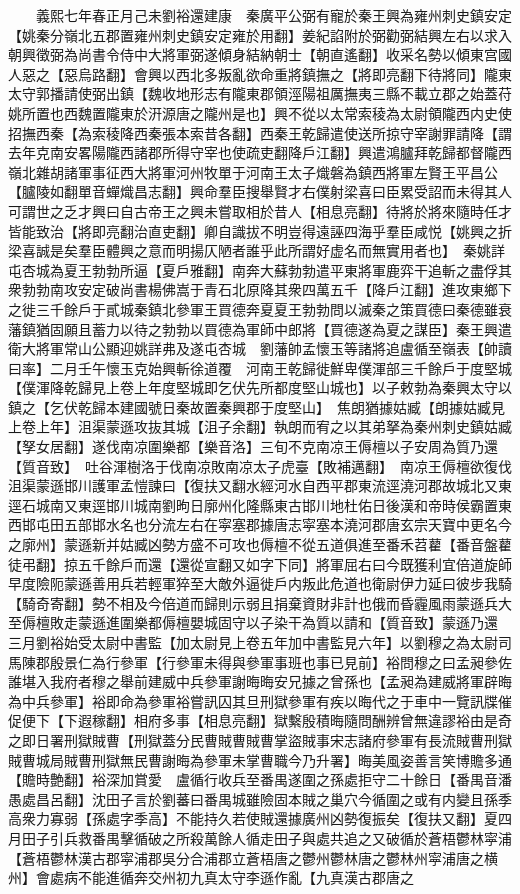　　義熙七年春正月己未劉裕還建康　秦廣平公弼有寵於秦王興為雍州刺史鎮安定【姚秦分嶺北五郡置雍州刺史鎮安定雍於用翻】姜紀諂附於弼勸弼結興左右以求入朝興徵弼為尚書令侍中大將軍弼遂傾身結納朝士【朝直遙翻】收采名勢以傾東宫國人惡之【惡烏路翻】會興以西北多叛亂欲命重將鎮撫之【將即亮翻下待將同】隴東太守郭播請使弼出鎮【魏收地形志有隴東郡領涇陽祖厲撫夷三縣不載立郡之始蓋苻姚所置也西魏置隴東於汧源唐之隴州是也】興不從以太常索稜為太尉領隴西内史使招撫西秦【為索稜降西秦張本索昔各翻】西秦王乾歸遣使送所掠守宰謝罪請降【謂去年克南安畧陽隴西諸郡所得守宰也使疏吏翻降戶江翻】興遣鴻臚拜乾歸都督隴西嶺北雜胡諸軍事征西大將軍河州牧單于河南王太子熾磐為鎮西將軍左賢王平昌公【臚陵如翻單音蟬熾昌志翻】興命羣臣搜舉賢才右僕射梁喜曰臣累受詔而未得其人可謂世之乏才興曰自古帝王之興未嘗取相於昔人【相息亮翻】待將於將來隨時任才皆能致治【將即亮翻治直吏翻】卿自識拔不明豈得遠誣四海乎羣臣咸悦【姚興之折梁喜誠是矣羣臣體興之意而明揚仄陋者誰乎此所謂好虚名而無實用者也】　秦姚詳屯杏城為夏王勃勃所逼【夏戶雅翻】南奔大蘇勃勃遣平東將軍鹿弈干追斬之盡俘其衆勃勃南攻安定破尚書楊佛嵩于青石北原降其衆四萬五千【降戶江翻】進攻東鄉下之徙三千餘戶于貳城秦鎮北參軍王買德奔夏夏王勃勃問以滅秦之策買德曰秦德雖衰藩鎮猶固願且蓄力以待之勃勃以買德為軍師中郎將【買德遂為夏之謀臣】秦王興遣衛大將軍常山公顯迎姚詳弗及遂屯杏城　劉藩帥孟懷玉等諸將追盧循至嶺表【帥讀曰率】二月壬午懷玉克始興斬徐道覆　河南王乾歸徙鮮卑僕渾部三千餘戶于度堅城【僕渾降乾歸見上卷上年度堅城即乞伏先所都度堅山城也】以子敕勃為秦興太守以鎮之【乞伏乾歸本建國號日秦故置秦興郡于度堅山】　焦朗猶據姑臧【朗據姑臧見上卷上年】沮渠蒙遜攻抜其城【沮子余翻】執朗而宥之以其弟拏為秦州刺史鎮姑臧【孥女居翻】遂伐南凉圍樂都【樂音洛】三旬不克南凉王傉檀以子安周為質乃還【質音致】　吐谷渾樹洛于伐南凉敗南凉太子虎臺【敗補邁翻】　南凉王傉檀欲復伐沮渠蒙遜邯川護軍孟愷諫曰【復扶又翻水經河水自西平郡東流逕澆河郡故城北又東逕石城南又東逕邯川城南劉昫日廓州化隆縣東古邯川地杜佑日後漢和帝時侯霸置東西邯屯田五部邯水名也分流左右在寜塞郡據唐志寜塞本澆河郡唐玄宗天寶中更名今之廓州】蒙遜新并姑臧凶勢方盛不可攻也傉檀不從五道俱進至番禾苕藋【番音盤藋徒弔翻】掠五千餘戶而還【還從宣翻又如字下同】將軍屈右曰今既獲利宜倍道旋師早度險阨蒙遜善用兵若輕軍猝至大敵外逼徙戶内叛此危道也衛尉伊力延曰彼步我騎【騎奇寄翻】勢不相及今倍道而歸則示弱且捐棄資財非計也俄而昏霾風雨蒙遜兵大至傉檀敗走蒙遜進圍樂都傉檀嬰城固守以子染干為質以請和【質音致】蒙遜乃還　三月劉裕始受太尉中書監【加太尉見上卷五年加中書監見六年】以劉穆之為太尉司馬陳郡殷景仁為行參軍【行參軍未得與參軍事班也事已見前】裕問穆之曰孟昶參佐誰堪入我府者穆之舉前建威中兵參軍謝晦晦安兄據之曾孫也【孟昶為建威將軍辟晦為中兵參軍】裕即命為參軍裕嘗訊囚其旦刑獄參軍有疾以晦代之于車中一覽訊牒催促便下【下遐稼翻】相府多事【相息亮翻】獄繫殷積晦隨問酬辨曾無違謬裕由是奇之即日署刑獄賊曹【刑獄蓋分民曹賊曹賊曹掌盜賊事宋志諸府參軍有長流賊曹刑獄賊曹城局賊曹刑獄無民曹謝晦為參軍未掌曹職今乃升署】晦美風姿善言笑博贍多通【贍時艶翻】裕深加賞愛　盧循行收兵至番禺遂圍之孫處拒守二十餘日【番禺音潘愚處昌呂翻】沈田子言於劉蕃曰番禺城雖險固本賊之巢穴今循圍之或有内變且孫季高衆力寡弱【孫處字季高】不能持久若使賊還據廣州凶勢復振矣【復扶又翻】夏四月田子引兵救番禺擊循破之所殺萬餘人循走田子與處共追之又破循於蒼梧鬱林寜浦【蒼梧鬱林漢古郡寜浦郡吳分合浦郡立蒼梧唐之鬱州鬱林唐之鬱林州寜浦唐之横州】會處病不能進循奔交州初九真太守李遜作亂【九真漢古郡唐之